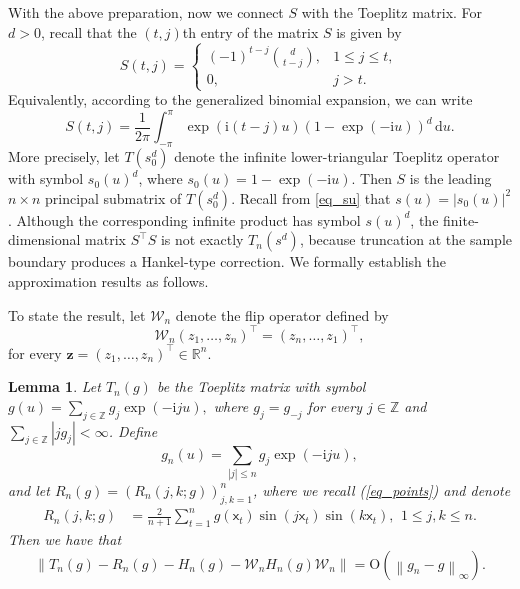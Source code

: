 \documentclass[11pt]{article}
\newtheorem{lemma}[theorem]{Lemma}
\newcommand{\sfx}{\mathsf{x}}
\numberwithin{equation}{section}
\numberwithin{figure}{section}
\begin{document}
With the above preparation, now we connect $S$ with the Toeplitz matrix. For \(d>0\), recall that the \((t,j)\)th entry of the matrix \(S\) is given by
\begin{equation*}
S(t,j)=\left\{
\begin{array}{cc}
(-1)^{t-j}\binom{d}{t-j}, & 1\leq j\leq t, \\
0, & j>t.
\end{array}
\right.
\end{equation*}
Equivalently, according to the generalized binomial expansion, we can write
\begin{equation*}
S(t,j)
=
\frac{1}{2\pi}
\int_{-\pi}^{\pi}
\exp(\mathrm{i}(t-j)u)
(1-\exp(-\mathrm{i}u))^d
\,\mathrm{d}u.
\end{equation*}
More precisely, let \(T(s_0^d)\) denote the infinite lower-triangular Toeplitz operator with symbol \(s_0(u)^d\), where $s_0(u)=1-\exp(-\mathrm{i}u)$. Then \(S\) is the leading \(n\times n\) principal submatrix of \(T(s_0^d)\). Recall from \eqref{eq_su} that \(s(u)=|s_0(u)|^2\). Although the corresponding infinite product has symbol \(s(u)^d\), the finite-dimensional matrix \(S^\top S\) is not exactly \(T_n(s^d)\), because truncation at the sample boundary produces a Hankel-type correction. We formally establish the approximation results as follows. 

To state the result, let \(\mathcal{W}_n\) denote the flip operator defined by
\begin{equation*}
\mathcal{W}_n(z_1,\ldots,z_n)^\top=(z_n,\ldots,z_1)^\top,
\end{equation*}
for every \(\bm{z}=(z_1,\ldots,z_n)^\top\in\mathbb{R}^n\).

\begin{lemma}\label{lem_aux_toeplitz}
Let \(T_n(g)\) be the Toeplitz matrix with symbol $g(u)=\sum_{j\in\mathbb{Z}}g_j\exp(-\mathrm{i}ju),$
where \(g_j=g_{-j}\) for every \(j\in\mathbb{Z}\) and $\sum_{j\in\mathbb{Z}}|jg_j|<\infty$. Define
\begin{equation*}
g_n(u)=\sum_{|j|\leq n}g_j\exp(-\mathrm{i}ju),
\end{equation*}
and let \(R_n(g)=(R_n(j,k;g))_{j,k=1}^n\), where we recall (\ref{eq_points}) and denote
\begin{align*}
R_n(j,k;g)
&=
\frac{2}{n+1}
\sum_{t=1}^{n}
g(\sfx_t)\sin(j\sfx_t)\sin(k\sfx_t), \ \,
1\leq j,k\leq n. 
\end{align*}
Then we have that 
\begin{equation*}
\left\|
T_n(g)-R_n(g)-H_n(g)-\mathcal{W}_nH_n(g)\mathcal{W}_n
\right\|
=
\mathrm{O}\!\left(\left\|g_n-g\right\|_\infty\right).
\end{equation*}
\end{lemma}
\end{document}
